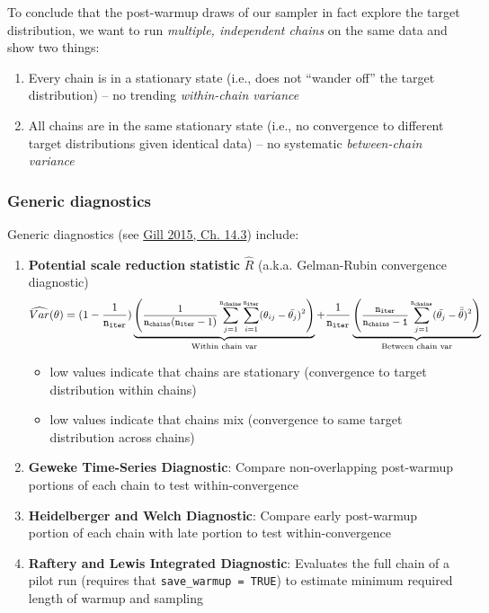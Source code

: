 \documentclass[
  11pt,
]{article}
\providecommand{\tightlist}{%
  \setlength{\itemsep}{0pt}\setlength{\parskip}{0pt}}
\begin{document}
To conclude that the post-warmup draws of our sampler in fact explore
the target distribution, we want to run \emph{multiple, independent chains} on the
same data and show two things:

\begin{enumerate}
\def\labelenumi{\arabic{enumi}.}
\tightlist
\item
  Every chain is in a stationary state (i.e., does not ``wander off''
  the target distribution) -- no trending \emph{within-chain variance}
\item
  All chains are in the same stationary state (i.e.,
  no convergence to different target distributions given identical
  data) -- no systematic \emph{between-chain variance}
\end{enumerate}

\hypertarget{generic-diagnostics}{%
\subsubsection{Generic diagnostics}\label{generic-diagnostics}}

Generic diagnostics (see \href{https://www.routledge.com/Bayesian-Methods-A-Social-and-Behavioral-Sciences-Approach-Third-Edition/Gill/p/book/9781439862483}{Gill 2015, Ch.
14.3})
include:

\begin{enumerate}
\def\labelenumi{\arabic{enumi}.}
\tightlist
\item
  \textbf{Potential scale reduction statistic} \(\hat{R}\) (a.k.a. Gelman-Rubin
  convergence diagnostic)
  \[\small \widehat{Var}(\theta) = (1 - \frac{1}{\mathtt{n_{iter}}})
   \underbrace{\Bigg(\frac{1}{ \mathtt{n_{chains}} (\mathtt{n_{iter}} - 1)} \sum_{j=1}^{\mathtt{n_{chains}}} \sum_{i=1}^{\mathtt{n_{iter}}} (\theta_{ij} - \bar{\theta_j})^2 \Bigg)}_{\text{Within chain var}} + 
   \frac{1}{\mathtt{n_{iter}}}  \underbrace{\Bigg(\frac{\mathtt{n_{iter}}}{\mathtt{n_{chains} - 1}} \sum_{j=1}^{\mathtt{n_{chains}}} (\bar{\theta_j} - \bar{\bar{\theta}})^2\Bigg)}_{\text{Between chain var}}\]

  \begin{itemize}
  \tightlist
  \item
    low values indicate that chains are stationary (convergence to
    target distribution within chains)
  \item
    low values indicate that chains mix (convergence to same target
    distribution across chains)
  \end{itemize}
\item
  \textbf{Geweke Time-Series Diagnostic}: Compare non-overlapping
  post-warmup portions of each chain to test within-convergence
\item
  \textbf{Heidelberger and Welch Diagnostic}: Compare early post-warmup
  portion of each chain with late portion to test within-convergence
\item
  \textbf{Raftery and Lewis Integrated Diagnostic}: Evaluates the full
  chain of a pilot run (requires that \texttt{save\_warmup\ =\ TRUE}) to
  estimate minimum required length of warmup and sampling
\end{enumerate}
\end{document}
